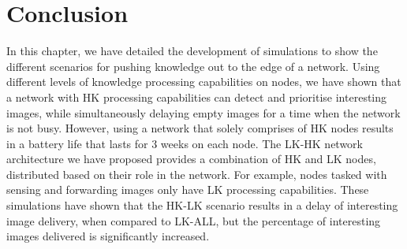 


\section{Conclusion} \label{sim:conc}
	
In this chapter, we have detailed the development of simulations to show the different scenarios for pushing knowledge out to the edge of a network. Using different levels of knowledge processing capabilities on nodes, we have shown that a network with HK processing capabilities can detect and prioritise interesting images, while simultaneously delaying empty images for a time when the network is not busy. However, using a network that solely comprises of HK nodes results in a battery life that lasts for 3 weeks on each node. The LK-HK network architecture we have proposed provides a combination of HK and LK nodes, distributed based on their role in the network. For example, nodes tasked with sensing and forwarding images only have LK processing capabilities. These simulations have shown that the HK-LK scenario results in a delay of interesting image delivery, when compared to LK-ALL, but the percentage of interesting images delivered is significantly increased.

